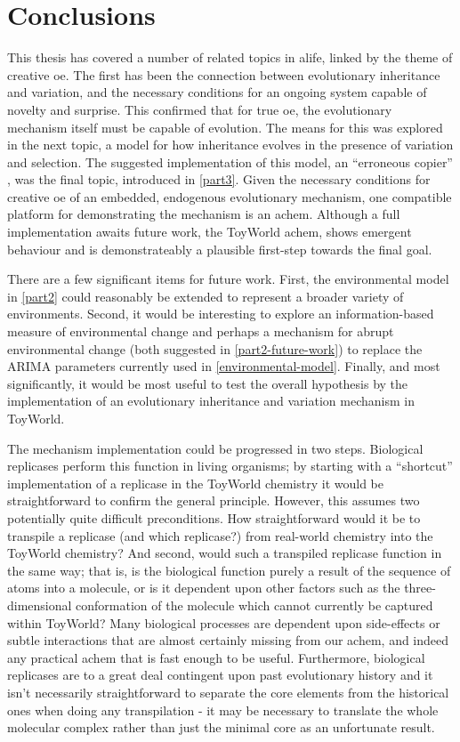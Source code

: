 \chapter{Conclusions}\label{thesis-conclusions}

This thesis has covered a number of related topics in \gls{alife}, linked by the theme of creative \gls{oe}. The first has been the connection between evolutionary inheritance and variation, and the necessary conditions for an ongoing system capable of novelty and surprise. This confirmed that for true \gls{oe}, the evolutionary mechanism itself must be capable of evolution. The means for this was explored in the next topic, a model for how inheritance evolves in the presence of variation and selection. The suggested implementation of this model, an ``erroneous copier'' \parencite{}, was the final topic, introduced in \cref{part3}. Given the necessary conditions for creative \gls{oe} of an embedded, endogenous evolutionary mechanism, one compatible platform for demonstrating the mechanism is an \gls{achem}. Although a full implementation awaits future work, the ToyWorld \gls{achem}, shows emergent behaviour and is demonstrateably a plausible first-step towards the final goal.

There are a few significant items for future work. First, the environmental model in \cref{part2} could reasonably be extended to represent a broader variety of environments. Second, it would be interesting to explore an information-based measure of environmental change and perhaps a mechanism for abrupt environmental change (both suggested in \cref{part2-future-work}) to replace the ARIMA parameters currently used in \cref{environmental-model}. Finally, and most significantly, it would be most useful to test the overall hypothesis by the implementation of an evolutionary inheritance and variation mechanism in ToyWorld.

The mechanism implementation could be progressed in two steps. Biological replicases perform this function in living organisms; by starting with a ``shortcut'' implementation of a replicase in the ToyWorld chemistry it would be straightforward to confirm the general principle. However, this assumes two potentially quite difficult preconditions. How straightforward would it be to transpile a replicase (and which replicase?) from real-world chemistry into the ToyWorld chemistry? And second, would such a transpiled replicase function in the same way; that is, is the biological function purely a result of the sequence of atoms into a molecule, or is it dependent upon other factors such as the three-dimensional conformation of the molecule which cannot currently be captured within ToyWorld? Many biological processes are dependent upon side-effects or subtle interactions that are almost certainly missing from our \gls{achem}, and indeed any practical \gls{achem} that is fast enough to be useful. Furthermore, biological replicases are to a great deal contingent upon past evolutionary history and it isn't necessarily straightforward to separate the core elements from the historical ones when doing any transpilation - it may be necessary to translate the whole molecular complex rather than just the minimal core as an unfortunate result.

